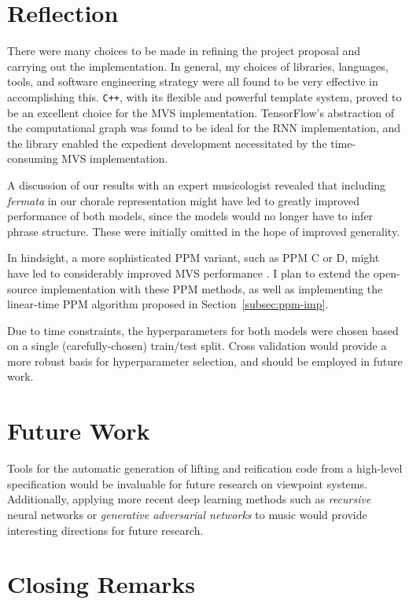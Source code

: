 \documentclass[12pt,a4paper,twoside,openright]{report}
\newcommand{\sref}[1]{Section~\ref{#1}}
\begin{document}
\section{Reflection}

There were many choices to be made in refining the project proposal and carrying
out the implementation. In general, my choices of libraries, languages, tools,
and software engineering strategy were all found to be very effective in
accomplishing this. \texttt{C++}, with its flexible and powerful template
system, proved to be an excellent choice for the MVS implementation.
TensorFlow's abstraction of the computational graph was found to be ideal for
the RNN implementation, and the library enabled the expedient development
necessitated by the time-consuming MVS implementation.

A discussion of our results with an expert musicologist revealed that including
\emph{fermata} in our chorale representation might have led to greatly improved
performance of both models, since the models would no longer have to infer
phrase structure. These were initially omitted in the hope of improved
generality.

In hindsight, a more sophisticated PPM variant, such as PPM C or D, might have
led to considerably improved MVS performance \cite{pearce2004combining}. I plan
to extend the open-source implementation with these PPM methods, as well as
implementing the linear-time PPM algorithm proposed in
\sref{subsec:ppm-imp}.

Due to time constraints, the hyperparameters for both models were chosen based
on a single (carefully-chosen) train/test split.  Cross validation would provide
a more robust basis for hyperparameter selection, and should be employed in
future work.

\section{Future Work}

Tools for the automatic generation of lifting and reification code from a
high-level specification would be invaluable for future research on viewpoint
systems. Additionally, applying more recent deep learning methods such as
\emph{recursive} neural networks or \emph{generative adversarial networks} to
music would provide interesting directions for future research.


\section{Closing Remarks}
\end{document}
